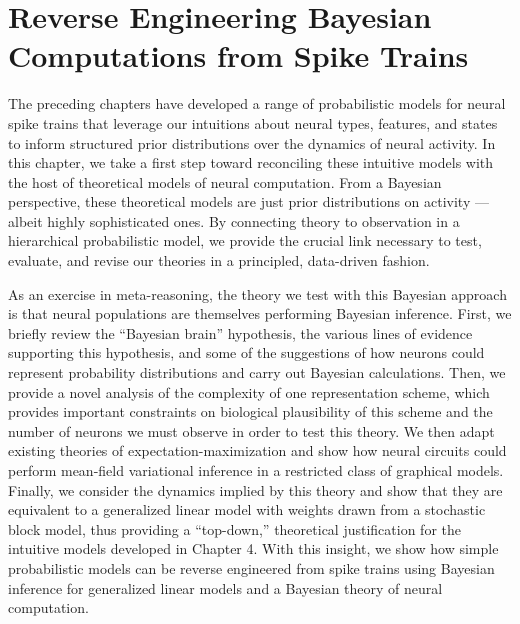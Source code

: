 \chapter{Reverse Engineering Bayesian Computations from Spike Trains}
\label{chap:nine}

The preceding chapters have developed a range of probabilistic models
for neural spike trains that leverage our intuitions about neural
types, features, and states to inform structured prior distributions over
the dynamics of neural activity. In this chapter, we take a
first step toward reconciling these intuitive models with the host of
theoretical models of neural computation. From a Bayesian perspective,
these theoretical models are just prior distributions on activity ---
albeit highly sophisticated ones. By connecting theory to observation
in a hierarchical probabilistic model, we provide the crucial link
necessary to test, evaluate, and revise our theories in a principled,
data-driven fashion.

As an exercise in meta-reasoning, the theory we test with this Bayesian
approach is that neural populations are themselves performing Bayesian
inference.
First, we briefly review the ``Bayesian brain'' hypothesis, the
various lines of evidence supporting this hypothesis, and some of
the suggestions of how neurons could represent probability distributions
and carry out Bayesian calculations. 
Then, we provide a novel analysis of the complexity of one
representation scheme, which provides important constraints on 
biological plausibility of this scheme and the number of neurons we
must observe in order to test this theory.
We then adapt existing theories of expectation-maximization and show how 
neural circuits could perform mean-field variational inference in
a restricted class of graphical models.
Finally, we consider the dynamics implied by this theory and show that
they are equivalent to a generalized linear model with weights drawn
from a stochastic block model, thus providing a ``top-down,'' theoretical
justification for the intuitive models developed in Chapter 4.
With this insight, we show how simple probabilistic models can
be reverse engineered from spike trains using Bayesian inference for
generalized linear models and a Bayesian theory of neural computation. 

